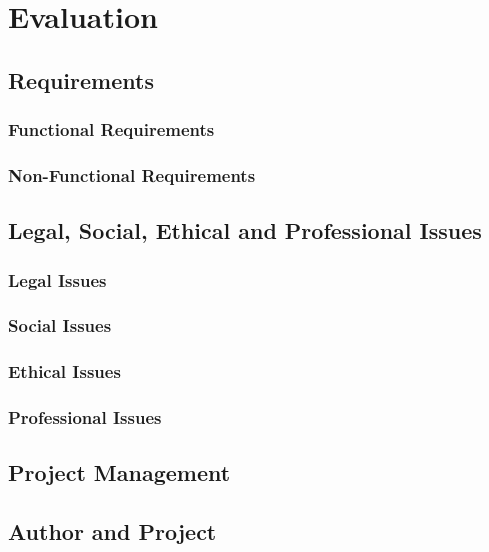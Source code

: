\chapter{Evaluation}
\label{Chapter:Evaluation}

\section{Requirements}
\subsection{Functional Requirements}
\subsection{Non-Functional Requirements}

\section{Legal, Social, Ethical and Professional Issues}
\subsection{Legal Issues}
\subsection{Social Issues}
\subsection{Ethical Issues}
\subsection{Professional Issues}

\section{Project Management}

\section{Author and Project}